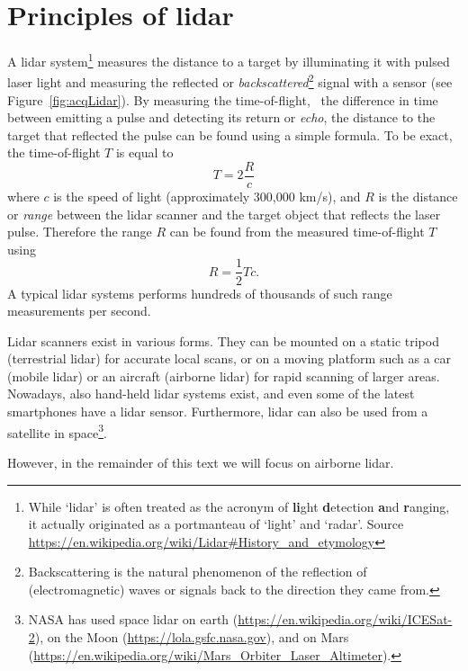 \section{Principles of lidar}%
\label{sec:lidar-principles}

A lidar system\footnote{While `lidar' is often treated as the acronym of \textbf{li}ght \textbf{d}etection \textbf{a}nd \textbf{r}anging, it actually originated as a portmanteau of `light' and `radar'. Source \url{https://en.wikipedia.org/wiki/Lidar\#History\_and\_etymology}} measures the distance to a target by illuminating it with pulsed laser light and measuring the reflected or \emph{backscattered}\footnote{Backscattering is the natural phenomenon of  the reflection of (electromagnetic) waves or signals back to the direction they came from.} signal with a sensor (see Figure~\ref{fig:acqLidar}). 
By measuring the time-of-flight, 
\ie\ the difference in time between emitting a pulse and detecting its return or \emph{echo}, the distance to the target that reflected the pulse can be found using a simple formula. To be exact, the time-of-flight $T$ is equal to
\begin{equation}
	\label{eq:tof}
	T= 2 \frac{R}{c}
\end{equation}
where $c$ is the speed of  light (approximately 300,000 km/s), and $R$ is the distance or \emph{range} between the lidar scanner and the target object that reflects the laser pulse. Therefore the range $R$ can be found from the measured time-of-flight $T$ using
\begin{equation*}
	R = \frac{1}{2} Tc.
\end{equation*}
A typical lidar systems performs hundreds of thousands of such range measurements per second. 

Lidar scanners exist in various forms. 
They can be mounted on a static tripod (terrestrial lidar) for accurate local scans, or on a moving platform such as a car (mobile lidar) or an aircraft (airborne lidar) for rapid scanning of larger areas. Nowadays, also hand-held lidar systems exist, and even some of the latest smartphones  have a lidar sensor. Furthermore, lidar can also be used from a satellite in space\footnote{NASA has used space lidar on earth (\url{https://en.wikipedia.org/wiki/ICESat-2}), on the Moon (\url{https://lola.gsfc.nasa.gov}), and on Mars (\url{https://en.wikipedia.org/wiki/Mars_Orbiter_Laser_Altimeter}).}. 

However, in the remainder of this text we will focus on airborne lidar.


